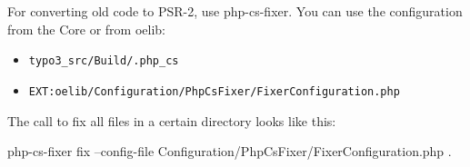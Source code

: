 For converting old code to PSR-2, use php-cs-fixer. You can use the configuration from the Core or from oelib:

\begin{itemize}
  \item \texttt{typo3\_src/Build/.php\_cs}
  \item \texttt{EXT:oelib/Configuration/PhpCsFixer/FixerConfiguration.php}
\end{itemize}

The call to fix all files in a certain directory looks like this:

\begin{textcode}
php-cs-fixer fix --config-file Configuration/PhpCsFixer/FixerConfiguration.php .
\end{textcode}
